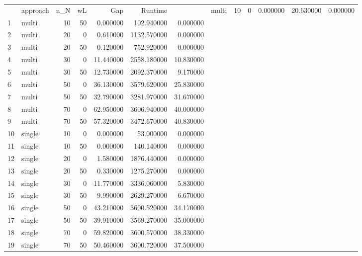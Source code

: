 \begin{tabular}{llrrrrr}
\toprule
 & approach & n_N & wL & Gap & Runtime & %
 & multi & 10 & 0 & 0.000000 & 20.630000 & 0.000000 \\
1 & multi & 10 & 50 & 0.000000 & 102.940000 & 0.000000 \\
2 & multi & 20 & 0 & 0.610000 & 1132.570000 & 0.000000 \\
3 & multi & 20 & 50 & 0.120000 & 752.920000 & 0.000000 \\
4 & multi & 30 & 0 & 11.440000 & 2558.180000 & 10.830000 \\
5 & multi & 30 & 50 & 12.730000 & 2092.370000 & 9.170000 \\
6 & multi & 50 & 0 & 36.130000 & 3579.620000 & 25.830000 \\
7 & multi & 50 & 50 & 32.790000 & 3281.970000 & 31.670000 \\
8 & multi & 70 & 0 & 62.950000 & 3606.940000 & 40.000000 \\
9 & multi & 70 & 50 & 57.320000 & 3472.670000 & 40.830000 \\
10 & single & 10 & 0 & 0.000000 & 53.000000 & 0.000000 \\
11 & single & 10 & 50 & 0.000000 & 140.140000 & 0.000000 \\
12 & single & 20 & 0 & 1.580000 & 1876.440000 & 0.000000 \\
13 & single & 20 & 50 & 0.330000 & 1275.270000 & 0.000000 \\
14 & single & 30 & 0 & 11.770000 & 3336.060000 & 5.830000 \\
15 & single & 30 & 50 & 9.990000 & 2629.270000 & 6.670000 \\
16 & single & 50 & 0 & 43.210000 & 3600.520000 & 34.170000 \\
17 & single & 50 & 50 & 39.910000 & 3569.270000 & 35.000000 \\
18 & single & 70 & 0 & 59.820000 & 3600.570000 & 38.330000 \\
19 & single & 70 & 50 & 50.460000 & 3600.720000 & 37.500000 \\
\bottomrule
\end{tabular}
